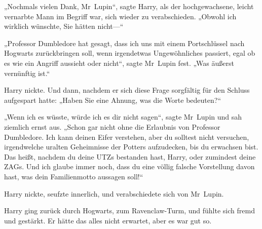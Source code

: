 „Nochmals vielen Dank, Mr~Lupin“, sagte Harry, als der hochgewachsene, leicht vernarbte Mann im Begriff war, sich wieder zu verabschieden. „Obwohl ich wirklich wünschte, Sie hätten nicht—“

„Professor Dumbledore hat gesagt, dass ich uns mit einem Portschlüssel nach Hogwarts zurückbringen soll, wenn irgendetwas Ungewöhnliches passiert, egal ob es wie ein Angriff aussieht oder nicht“, sagte Mr~Lupin fest. „Was äußerst vernünftig ist.“

Harry nickte. Und dann, nachdem er sich diese Frage sorgfältig für den Schluss aufgespart hatte: „Haben Sie eine Ahnung, was die Worte bedeuten?“

„Wenn ich es wüsste, würde ich es dir nicht sagen“, sagte Mr~Lupin und sah ziemlich ernst aus. „Schon gar nicht ohne die Erlaubnis von Professor Dumbledore. Ich kann deinen Eifer verstehen, aber du solltest nicht versuchen, irgendwelche uralten Geheimnisse der Potters aufzudecken, bis du erwachsen bist. Das heißt, nachdem du deine UTZs bestanden hast, Harry, oder zumindest deine ZAGs. Und ich glaube immer noch, dass du eine völlig falsche Vorstellung davon hast, was dein Familienmotto aussagen soll!“

Harry nickte, seufzte innerlich, und verabschiedete sich von Mr~Lupin.

\later

Harry ging zurück durch Hogwarts, zum Ravenclaw-Turm, und fühlte sich fremd und gestärkt. Er hätte das alles nicht erwartet, aber es war gut so.

